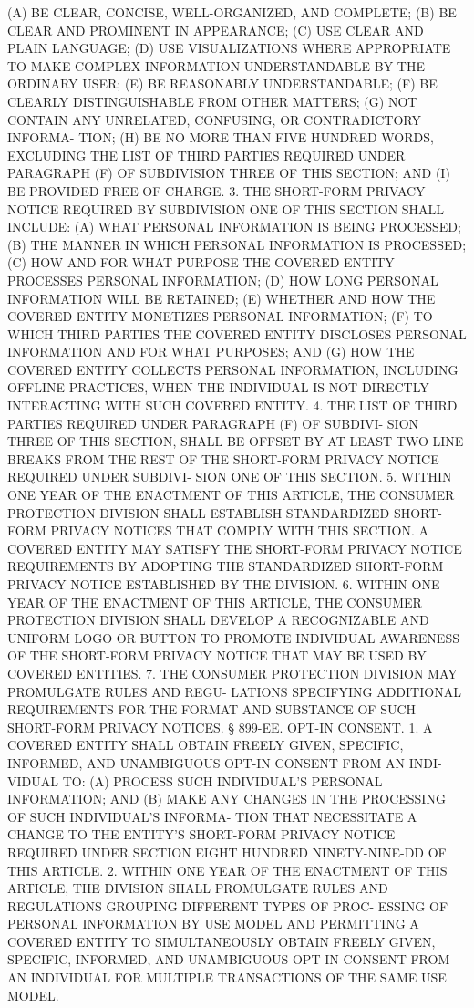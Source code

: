    (A) BE CLEAR, CONCISE, WELL-ORGANIZED, AND COMPLETE;
   (B) BE CLEAR AND PROMINENT IN APPEARANCE;
   (C) USE CLEAR AND PLAIN LANGUAGE;
   (D)  USE  VISUALIZATIONS WHERE APPROPRIATE TO MAKE COMPLEX INFORMATION
 UNDERSTANDABLE BY THE ORDINARY USER;
   (E) BE REASONABLY UNDERSTANDABLE;
   (F) BE CLEARLY DISTINGUISHABLE FROM OTHER MATTERS;
   (G) NOT CONTAIN ANY UNRELATED, CONFUSING,  OR  CONTRADICTORY  INFORMA-
 TION;
   (H)  BE  NO  MORE THAN FIVE HUNDRED WORDS, EXCLUDING THE LIST OF THIRD
 PARTIES REQUIRED UNDER  PARAGRAPH  (F)  OF  SUBDIVISION  THREE  OF  THIS
 SECTION; AND
   (I) BE PROVIDED FREE OF CHARGE.
   3.  THE  SHORT-FORM PRIVACY NOTICE REQUIRED BY SUBDIVISION ONE OF THIS
 SECTION SHALL INCLUDE:
   (A) WHAT PERSONAL INFORMATION IS BEING PROCESSED;
   (B) THE MANNER IN WHICH PERSONAL INFORMATION IS PROCESSED;
   (C) HOW AND FOR WHAT PURPOSE THE  COVERED  ENTITY  PROCESSES  PERSONAL
 INFORMATION;
   (D) HOW LONG PERSONAL INFORMATION WILL BE RETAINED;
   (E) WHETHER AND HOW THE COVERED ENTITY MONETIZES PERSONAL INFORMATION;
   (F)  TO  WHICH  THIRD  PARTIES  THE  COVERED ENTITY DISCLOSES PERSONAL
 INFORMATION AND FOR WHAT PURPOSES; AND
   (G) HOW THE COVERED ENTITY COLLECTS  PERSONAL  INFORMATION,  INCLUDING
 OFFLINE  PRACTICES, WHEN THE INDIVIDUAL IS NOT DIRECTLY INTERACTING WITH
 SUCH COVERED ENTITY.
   4. THE LIST OF THIRD PARTIES REQUIRED UNDER PARAGRAPH (F) OF  SUBDIVI-
 SION  THREE OF THIS SECTION, SHALL BE OFFSET BY AT LEAST TWO LINE BREAKS
 FROM THE REST OF THE SHORT-FORM PRIVACY NOTICE REQUIRED  UNDER  SUBDIVI-
 SION ONE OF THIS SECTION.
   5.  WITHIN  ONE  YEAR  OF  THE ENACTMENT OF THIS ARTICLE, THE CONSUMER
 PROTECTION DIVISION  SHALL  ESTABLISH  STANDARDIZED  SHORT-FORM  PRIVACY
 NOTICES  THAT COMPLY WITH THIS SECTION. A COVERED ENTITY MAY SATISFY THE
 SHORT-FORM PRIVACY NOTICE  REQUIREMENTS  BY  ADOPTING  THE  STANDARDIZED
 SHORT-FORM PRIVACY NOTICE ESTABLISHED BY THE DIVISION.
   6.  WITHIN  ONE  YEAR  OF  THE ENACTMENT OF THIS ARTICLE, THE CONSUMER
 PROTECTION DIVISION SHALL DEVELOP A RECOGNIZABLE  AND  UNIFORM  LOGO  OR
 BUTTON  TO PROMOTE INDIVIDUAL AWARENESS OF THE SHORT-FORM PRIVACY NOTICE
 THAT MAY BE USED BY COVERED ENTITIES.
   7. THE CONSUMER PROTECTION DIVISION MAY  PROMULGATE  RULES  AND  REGU-
 LATIONS  SPECIFYING ADDITIONAL REQUIREMENTS FOR THE FORMAT AND SUBSTANCE
 OF SUCH SHORT-FORM PRIVACY NOTICES.
   § 899-EE. OPT-IN CONSENT. 1. A  COVERED  ENTITY  SHALL  OBTAIN  FREELY
 GIVEN,  SPECIFIC, INFORMED, AND UNAMBIGUOUS OPT-IN CONSENT FROM AN INDI-
 VIDUAL TO:
   (A) PROCESS SUCH INDIVIDUAL'S PERSONAL INFORMATION; AND
   (B) MAKE ANY CHANGES IN THE PROCESSING OF SUCH  INDIVIDUAL'S  INFORMA-
 TION THAT NECESSITATE A CHANGE TO THE ENTITY'S SHORT-FORM PRIVACY NOTICE
 REQUIRED UNDER SECTION EIGHT HUNDRED NINETY-NINE-DD OF THIS ARTICLE.
   2.  WITHIN  ONE  YEAR  OF  THE ENACTMENT OF THIS ARTICLE, THE DIVISION
 SHALL PROMULGATE RULES AND REGULATIONS GROUPING DIFFERENT TYPES OF PROC-
 ESSING OF PERSONAL INFORMATION BY USE MODEL  AND  PERMITTING  A  COVERED
 ENTITY  TO  SIMULTANEOUSLY  OBTAIN FREELY GIVEN, SPECIFIC, INFORMED, AND
 UNAMBIGUOUS OPT-IN CONSENT FROM AN INDIVIDUAL FOR MULTIPLE  TRANSACTIONS
 OF THE SAME USE MODEL.

